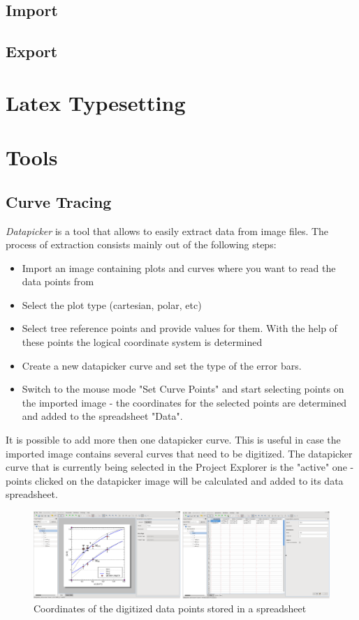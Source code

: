 \section{Import}
\section{Export}

\chapter{Latex Typesetting}

\chapter{Tools}
\section{Curve Tracing}
\textit{Datapicker} is a tool that allows to easily extract data from image files. The process of extraction consists mainly out of the following steps:
\begin{itemize}
\item Import an image containing plots and curves where you want to read the data points from
\item Select the plot type (cartesian, polar, etc) 
\item Select tree reference points and provide values for them. With the help of these points the logical coordinate system is determined
\item Create a new datapicker curve and set the type of the error bars.
\item Switch to the mouse mode "Set Curve Points" and start selecting points on the imported image - the coordinates for the selected points are determined and added to the spreadsheet "Data".
\end{itemize}

It is possible to add more then one datapicker curve. This is useful in case the imported image contains several curves that need to be digitized.
The datapicker curve that is currently being selected in the Project Explorer is the "active" one - points clicked on the datapicker image will be calculated and added to its data spreadsheet.
\begin{figure}
\includegraphics[width=\textwidth]{images/datapicker_active_curve_data_spreadsheet.png}
\caption{Coordinates of the digitized data points stored in a spreadsheet}
\end{figure}

